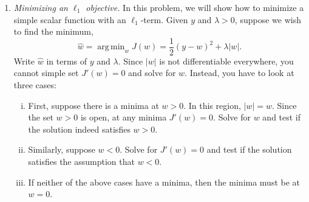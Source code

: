 \documentclass[11pt]{article}
\def\argmin{\mathop{\mathrm{arg\,min}}}
\begin{document}
\begin{enumerate}
\item \emph{Minimizing an $\ell_1$ objective.}
In this problem, we will show how to minimize a simple scalar function with
an $\ell_1$-term.  Given $y$ and $\lambda > 0$, suppose we wish to find the minimum,
\[
    \widehat{w} = \argmin_w J(w) = \frac{1}{2}(y-w)^2 + \lambda|w|.
\]
Write $\widehat{w}$ in terms of $y$ and $\lambda$.  Since $|w|$ is not
differentiable everywhere, you cannot simple set $J'(w)=0$ and solve for $w$.
Instead, you have to look at three cases:
\begin{enumerate}[(i)]
  \item First, suppose there is a minima at $w > 0$.  In this region, $|w| = w$.
  Since the set $w > 0$ is open, at any minima $J'(w)=0$. Solve for $w$ and
  test if the solution indeed satisfies $w > 0$.
  \item Similarly, suppose $w < 0$. Solve for $J'(w) = 0$ and test if the solution
  satisfies the assumption that $w < 0$.
  \item If neither of the above cases have a minima, then the minima must be at
  $w=0$.
\end{enumerate}


\end{enumerate}
\end{document}
